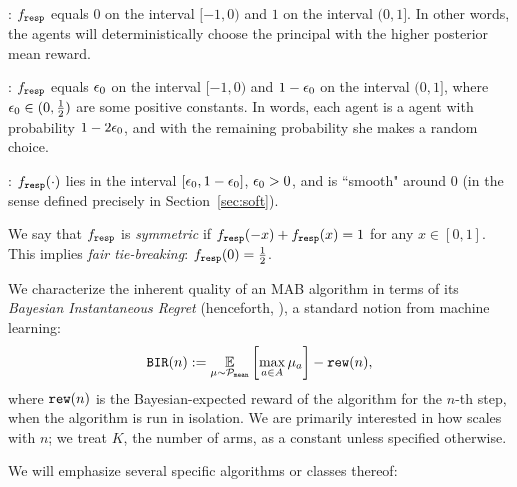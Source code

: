 \begin{OneLiners}
\item \HardMax: $f_{\mathtt{resp}}$ equals $0$ on the interval $[-1,0)$ and $1$
  on the interval $(0,1]$. In other words, the agents will
  deterministically choose the principal with the higher posterior
  mean reward.

\item \HardMaxRandom:
    $f_{\mathtt{resp}}$ equals $\epsilon_0$ on the interval $[-1,0)$ and $1-\epsilon_0$ on the interval $(0,1]$, where $\epsilon_0\in (0,\tfrac12)$ are some positive constants. In words, each agent is a \HardMax agent with probability $1-2\epsilon_0$, and with the remaining probability she makes a random choice.


\item \SoftMaxRandom: $f_{\mathtt{resp}}(\cdot)$ lies in the interval $[\epsilon_0,1-\epsilon_0]$, $\epsilon_0>0$, and is ``smooth" around $0$ (in the sense defined precisely in Section~\ref{sec:soft}).
\end{OneLiners}

We say that $f_{\mathtt{resp}}$ is \emph{symmetric} if $f_{\mathtt{resp}}(-x)+f_{\mathtt{resp}}(x)=1$
for any $x\in [0,1]$. This implies \emph{fair tie-breaking}:
$f_{\mathtt{resp}}(0)=\tfrac12$.%

We characterize the inherent quality of an MAB algorithm in terms of its \emph{Bayesian Instantaneous Regret} (henceforth, \BIR), a standard notion from machine learning:
\begin{align}
\BIR(n) := \E_{\mu\sim\priorMu}
    \left[ \max_{a\in A} \mu_a\right] - \rew(n),
\end{align}
where $\mathtt{rew}(n)$ is the Bayesian-expected reward of the algorithm for the $n$-th step, when the algorithm is run in isolation. We are primarily interested in how \BIR scales with $n$; we treat $K$, the number of arms, as a constant unless specified otherwise.

We will emphasize several specific algorithms or classes thereof:

